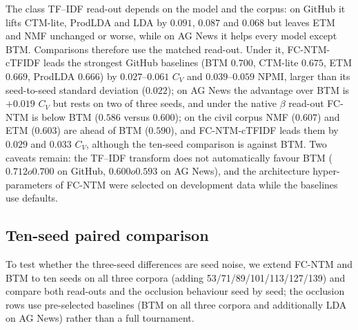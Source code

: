 \documentclass{article}
\begin{document}
The class TF--IDF read-out depends on the model and the corpus: on GitHub it lifts CTM-lite,
ProdLDA and LDA by $0.091$, $0.087$ and $0.068$ but leaves ETM and NMF unchanged or worse, while on
AG News it helps every model except BTM. Comparisons therefore use the matched read-out. Under it,
FC-NTM-cTFIDF leads the strongest GitHub baselines (BTM $0.700$, CTM-lite $0.675$, ETM $0.669$,
ProdLDA $0.666$) by $0.027$--$0.061$ $C_V$ and $0.039$--$0.059$ NPMI, larger than its seed-to-seed
standard deviation ($0.022$); on AG News the advantage over BTM is $+0.019$ $C_V$ but rests on two
of three seeds, and under the native $\beta$ read-out FC-NTM is below BTM ($0.586$ versus
$0.600$); on the civil corpus NMF ($0.607$) and ETM ($0.603$) are ahead of BTM ($0.590$), and
FC-NTM-cTFIDF leads them by $0.029$ and $0.033$ $C_V$, although the ten-seed comparison is
against BTM. Two caveats remain: the TF--IDF transform does not automatically favour BTM
($0.712	o0.700$ on GitHub, $0.600	o0.593$ on AG News), and the architecture hyper-parameters
of FC-NTM were selected on development data while the baselines use defaults.

\subsection{Ten-seed paired comparison}

To test whether the three-seed differences are seed noise, we extend FC-NTM and BTM to ten seeds
on all three corpora (adding 53/71/89/101/113/127/139) and compare both read-outs and the
occlusion behaviour seed by seed; the occlusion rows use pre-selected baselines (BTM on all three
corpora and additionally LDA on AG News) rather than a full tournament.
\end{document}
